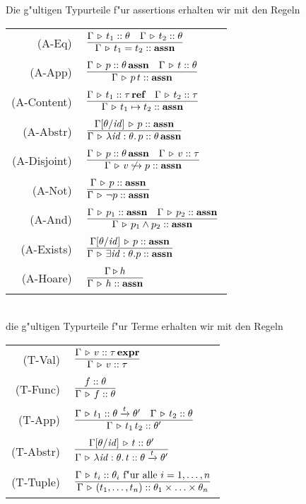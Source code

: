 \documentclass[12pt,a4paper,bigheadings]{scrartcl}
\newcommand{\assn}{\ensuremath{\mathbf{assn}}}
\newcommand{\atype}[1]{#1\,\assn}
\newcommand{\bexpr}{\ensuremath{\mathbf{expr}}}
\newcommand{\etype}[1]{#1\,\bexpr}
\newcommand{\tto}{\ensuremath{\xrightarrow{t}}}
\renewcommand{\disjoint}[2]{\ensuremath{#2\not\hookrightarrow#1}}
\newcommand{\RN}[1]{\mbox{{\sc (#1)}}}
\begin{document}
Die g"ultigen Typurteile f"ur assertions erhalten wir mit den Regeln \\[3mm]
\begin{tabular}{rl}
  \RN{A-Eq} & $\regel{\Tj{\Gamma}{t_1}{\theta} \quad \Tj{\Gamma}{t_2}{\theta}}
                     {\Tj{\Gamma}{t_1 = t_2}{\assn}}$ \\[1mm]
  \RN{A-App} & $\regel{\Tj{\Gamma}{p}{\atype{\theta}} \quad \Tj{\Gamma}{t}{\theta}}
                      {\Tj{\Gamma}{\app{p}{t}}{\assn}}$ \\[1mm]
  \RN{A-Content} & $\regel{\Tj{\Gamma}{t_1}{\reftype{\tau}} \quad \Tj{\Gamma}{t_2}{\tau}}
                          {\Tj{\Gamma}{t_1 \mapsto t_2}{\assn}}$ \\[1mm]
  \RN{A-Abstr} & $\regel{\Tj{\Gamma[\theta/\id]}{p}{\assn}}
                        {\Tj{\Gamma}{\abstr{\id:\theta}{p}}{\atype{\theta}}}$ \\[1mm]
  \RN{A-Disjoint} & $\regel{\Tj{\Gamma}{p}{\atype{\theta}} \quad \Tj{\Gamma}{v}{\tau}}
                           {\Tj{\Gamma}{\disjoint{p}{v}}{\assn}}$ \\[1mm]
  \RN{A-Not} & $\regel{\Tj{\Gamma}{p}{\assn}}
                      {\Tj{\Gamma}{\neg p}{\assn}}$ \\[1mm]
  \RN{A-And} & $\regel{\Tj{\Gamma}{p_1}{\assn} \quad \Tj{\Gamma}{p_2}{\assn}}
                      {\Tj{\Gamma}{p_1 \wedge p_2}{\assn}}$ \\[1mm]
  \RN{A-Exists} & $\regel{\Tj{\Gamma[\theta/\id]}{p}{\assn}}
                         {\Tj{\Gamma}{\exists \id:\theta.p}{\assn}}$ \\[1mm]
  \RN{A-Hoare} & $\regel{\Tjh{\Gamma}{h}}
                        {\Tj{\Gamma}{h}{\assn}}$
\end{tabular} \\[3mm]
die g"ultigen Typurteile f"ur Terme erhalten wir mit den Regeln \\[3mm]
\begin{tabular}{rl}
  \RN{T-Val} & $\regel{\Tj{\Gamma}{v}{\etype{\tau}}}
                      {\Tj{\Gamma}{v}{\tau}}$ \\[1mm]
  \RN{T-Func} & $\regel{\tj{f}{\theta}}
                       {\Tj{\Gamma}{f}{\theta}}$ \\[1mm]
  \RN{T-App} & $\regel{\Tj{\Gamma}{t_1}{\theta \tto \theta'} \quad \Tj{\Gamma}{t_2}{\theta}}
                      {\Tj{\Gamma}{\app{t_1}{t_2}}{\theta'}}$ \\[1mm]
  \RN{T-Abstr} & $\regel{\Tj{\Gamma[\theta/\id]}{t}{\theta'}}
                        {\Tj{\Gamma}{\abstr{\id:\theta}{t}}{\theta \tto \theta'}}$ \\[1mm]
  \RN{T-Tuple} & $\regel{\Tj{\Gamma}{t_i}{\theta_i} \text{ f"ur alle } i=1,\ldots,n}
                        {\Tj{\Gamma}{(t_1,\ldots,t_n)}{\theta_1\times\ldots\times\theta_n}}$
\end{tabular} \\[3mm]
\end{document}
